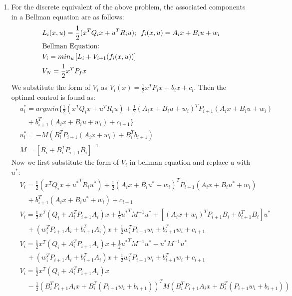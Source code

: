\begin{enumerate}
\begin{enumerate}
  \item For the discrete equivalent of the above problem, the associated components in a Bellman equation are as follows:
  \begin{align*}
   &L_i(x,u) = \frac{1}{2}(x^T Q_i x + u^T R_i u); \enskip f_i(x,u) = A_i x + B_i u + w_i\\
   &\mbox{Bellman Equation: }\\
   &V_i = min_u \left[L_i + V_{i+1}(f_i(x,u))\right]\\
   &V_N = \frac{1}{2} x^T P_f x
  \end{align*}
  We substitute the form of $V_i$ as $V_i(x) = \frac{1}{2} x^TP_i x + b_i x + c_i$. Then the optimal control is found as:
  \begin{align*}
   &u^*_i = argmin\{\frac{1}{2}(x^T Q_i x + u^T R_i u) + \frac{1}{2} (A_i x + B_i u + w_i)^T P_{i+1} (A_i x + B_i u + w_i) \\
   &\quad + b_{i+1}^T (A_i x + B_i u + w_i) + c_{i+1}\}\\
   &u^*_i = -M\left(B_i^T P_{i+1}(A_i x + w_i) + B_i^T b_{i+1}\right)\\
   &M = \left[R_i + B_i^TP_{i+1}B_i\right]^{-1}
  \end{align*}
  Now we first substitute the form of $V_i$ in bellman equation and replace u with $u^*$:
  \begin{align*}
   &V_i = \frac{1}{2}(x^T Q_i x + {u^*}^T R_i {u^*}) + \frac{1}{2} (A_i x + B_i u^* + w_i)^T P_{i+1} (A_i x + B_i u^* + w_i) \\
   &\quad + b_{i+1}^T (A_i x + B_i u^* + w_i) + c_{i+1}\\
   &V_i = \frac{1}{2}x^T\left(Q_i + A_i^T P_{i+1}A_i\right)x + \frac{1}{2}{u^*}^T M^{-1} u^* + \left[(A_i x + w_i)^T P_{i+1} B_i + b_{i+1}^T B_i\right] u^* \\
   &\quad  + (w_i^T P_{i+1}A_i + b_{i+1}^T A_i) x + \frac{1}{2}w_i^T P_{i+1} w_i + b_{i+1}^T w_i + c_{i+1}\\
   &V_i = \frac{1}{2}x^T\left(Q_i + A_i^T P_{i+1}A_i\right)x + \frac{1}{2}{u^*}^T M^{-1} u^* -u^* M^{-1} u^* \\
   &\quad  + (w_i^T P_{i+1}A_i + b_{i+1}^T A_i) x + \frac{1}{2}w_i^T P_{i+1} w_i + b_{i+1}^T w_i + c_{i+1}\\
   &V_i = \frac{1}{2}x^T\left(Q_i + A_i^T P_{i+1}A_i\right)x \\
   &\quad - \frac{1}{2} \left(B_i^T P_{i+1}A_i x + B_i^T (P_{i+1} w_i + b_{i+1})\right)^T M \left(B_i^T P_{i+1}A_i x + B_i^T(P_{i+1} w_i + b_{i+1})\right)\\

\end{align*}
\end{enumerate}
\end{enumerate}
